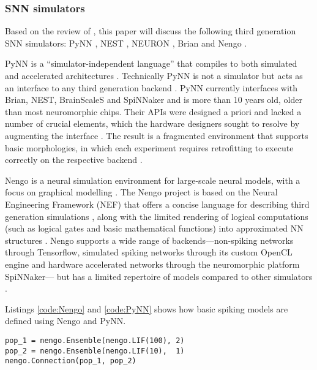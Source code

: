 \documentclass[report.tex]{subfiles}
\begin{document}
\subsubsection{\Gls{SNN} simulators} \label{sec:SNN-simulators}
Based on the review of \textcite{Blundell2018}, this paper will discuss
the following third generation \gls{SNN} simulators: PyNN \cite{Davison2009},
NEST \cite{Gewaltig2007}, NEURON \cite{Carnevale2007},
Brian \cite{Goodman2013} and Nengo \cite{Eliasmith2015}.

PyNN is a ``simulator-independent language''
\cite{PyNN2018} that compiles to both simulated and
accelerated architectures \cite{Davison2009}.
Technically PyNN is not a simulator but acts as an interface to any third generation
backend \cite{Davison2009}.
PyNN currently interfaces with Brian, NEST, BrainScaleS and SpiNNaker
and is more than 10 years old, \cite{Davison2009} older
than most neuromorphic chips. 
Their \gls{API}s were designed a priori and lacked a number of crucial
elements, which the hardware designers sought
to resolve by augmenting the interface \cite{Pfeil2013, PyNN2018}.
The result is a fragmented environment that supports basic morphologies, 
in which each experiment requires retrofitting to execute correctly on the respective backend \cite{PyNN2018}.

Nengo is a neural simulation environment for large-scale neural models, with
a focus on graphical modelling \cite{Eliasmith2015}. 
The Nengo project is based on the Neural Engineering Framework (NEF)
 that offers a concise language for
describing third generation simulations \cite{Bekolay2014}, along with
the limited rendering of logical computations (such as logical gates and basic
mathematical functions) into approximated
\gls{NN} structures \cite{Eliasmith2004, Eliasmith2015}.
Nengo supports a wide range of backends---non-spiking networks through Tensorflow,
simulated spiking networks through its custom \gls{OpenCL} engine and 
hardware accelerated networks through the neuromorphic platform SpiNNaker---
but has a limited repertoire of models compared to other simulators
\cite{Nengo2018}.

Listings \ref{code:Nengo} and \ref{code:PyNN} shows how
basic spiking models are defined using Nengo and PyNN.

\begin{minipage}{\linewidth}
\begin{lstlisting}
pop_1 = nengo.Ensemble(nengo.LIF(100), 2)
pop_2 = nengo.Ensemble(nengo.LIF(10),  1)
nengo.Connection(pop_1, pop_2)
\end{lstlisting}
\end{minipage}
\end{document}
